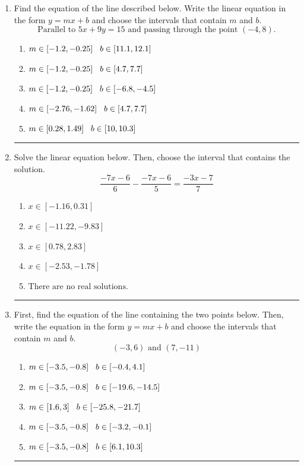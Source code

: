 \documentclass[14pt]{extbook}
\newcommand{\litem}[1]{\item#1\hspace*{-1cm}\rule{\textwidth}{0.4pt}}
\begin{document}
\begin{enumerate}
{\begin{enumerate}[label=\Alph*.]
\end{enumerate} }
\litem{
Find the equation of the line described below. Write the linear equation in the form $ y=mx+b $ and choose the intervals that contain $m$ and $b$.\[ \text{Parallel to } 5 x + 9 y = 15 \text{ and passing through the point } (-4, 8). \]\begin{enumerate}[label=\Alph*.]
\item \( m \in [-1.2, -0.25] \hspace*{3mm} b \in [11.1, 12.1] \)
\item \( m \in [-1.2, -0.25] \hspace*{3mm} b \in [4.7, 7.7] \)
\item \( m \in [-1.2, -0.25] \hspace*{3mm} b \in [-6.8, -4.5] \)
\item \( m \in [-2.76, -1.62] \hspace*{3mm} b \in [4.7, 7.7] \)
\item \( m \in [0.28, 1.49] \hspace*{3mm} b \in [10, 10.3] \)

\end{enumerate} }
\litem{
Solve the linear equation below. Then, choose the interval that contains the solution.\[ \frac{-7x -6}{6} - \frac{-7x -6}{5} = \frac{-3x -7}{7} \]\begin{enumerate}[label=\Alph*.]
\item \( x \in [-1.16, 0.31] \)
\item \( x \in [-11.22, -9.83] \)
\item \( x \in [0.78, 2.83] \)
\item \( x \in [-2.53, -1.78] \)
\item \( \text{There are no real solutions.} \)

\end{enumerate} }
\litem{
First, find the equation of the line containing the two points below. Then, write the equation in the form $ y=mx+b $ and choose the intervals that contain $m$ and $b$.\[ (-3, 6) \text{ and } (7, -11) \]\begin{enumerate}[label=\Alph*.]
\item \( m \in [-3.5, -0.8] \hspace*{3mm} b \in [-0.4, 4.1] \)
\item \( m \in [-3.5, -0.8] \hspace*{3mm} b \in [-19.6, -14.5] \)
\item \( m \in [1.6, 3] \hspace*{3mm} b \in [-25.8, -21.7] \)
\item \( m \in [-3.5, -0.8] \hspace*{3mm} b \in [-3.2, -0.1] \)
\item \( m \in [-3.5, -0.8] \hspace*{3mm} b \in [6.1, 10.3] \)


\end{enumerate}}
\end{enumerate}
\end{document}
